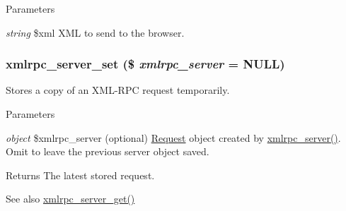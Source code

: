 \begin{DoxyParams}{Parameters}
\item[{\em string}]\$xml XML to send to the browser. \end{DoxyParams}
\hypertarget{xmlrpcs_8inc_a0797ab88a9029962cd404475d1dfd253}{
\subsubsection[{xmlrpc\_\-server\_\-set}]{\setlength{\rightskip}{0pt plus 5cm}xmlrpc\_\-server\_\-set (\$ {\em xmlrpc\_\-server} = {\ttfamily NULL})}}
\label{xmlrpcs_8inc_a0797ab88a9029962cd404475d1dfd253}
Stores a copy of an XML-\/RPC request temporarily.


\begin{DoxyParams}{Parameters}
\item[{\em object}]\$xmlrpc\_\-server (optional) \hyperlink{classRequest}{Request} object created by \hyperlink{xmlrpcs_8inc_aff1b954dfb418c8c13f2432e15a86dab}{xmlrpc\_\-server()}. Omit to leave the previous server object saved.\end{DoxyParams}
\begin{DoxyReturn}{Returns}
The latest stored request.
\end{DoxyReturn}
\begin{DoxySeeAlso}{See also}
\hyperlink{xmlrpcs_8inc_a368b9f8580aad3b04ad06387e0042b1d}{xmlrpc\_\-server\_\-get()} 
\end{DoxySeeAlso}
